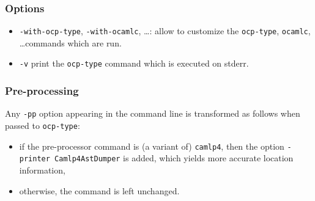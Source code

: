 \subsubsection*{Options}

\begin{itemize}
\item \verb!-with-ocp-type!, \verb!-with-ocamlc!, \ldots: allow to
  customize the \verb!ocp-type!, \verb!ocamlc!, \ldots commands which
  are run.

\item \verb!-v! print the \verb!ocp-type! command which is executed on
  stderr.
\end{itemize}

\subsubsection*{Pre-processing}
Any \verb!-pp! option appearing in the command line is transformed as
follows when passed to \verb!ocp-type!:
\begin{itemize}
\item if the pre-processor command is (a variant of) \verb!camlp4!,
  then the option \verb!-printer Camlp4AstDumper! is added, which
  yields more accurate location information,
\item otherwise, the command is left unchanged.
\end{itemize}
